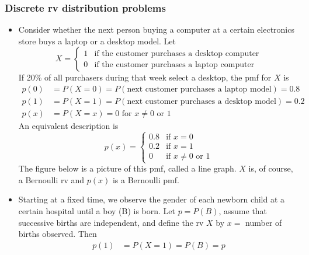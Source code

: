 \documentclass{report}
\begin{document}
    \pagebreak 
    \subsubsection{Discrete rv distribution problems}
    \begin{itemize}
        \item Consider whether the next person buying a computer at a certain electronics store buys a laptop or a desktop model. Let
            \[
                X = 
                \begin{cases} 
                    1 & \text{if the customer purchases a desktop computer} \\
                    0 & \text{if the customer purchases a laptop computer} 
                \end{cases}
            \]
            If 20\% of all purchasers during that week select a desktop, the pmf for \( X \) is
            \[
                \begin{aligned}
                    p(0) &= P(X = 0) = P(\text{next customer purchases a laptop model}) = 0.8 \\
                    p(1) &= P(X = 1) = P(\text{next customer purchases a desktop model}) = 0.2 \\
                    p(x) &= P(X = x) = 0 \text{ for } x \ne 0 \text{ or } 1
                \end{aligned}
            \]
            An equivalent description is
            \[
                p(x) = 
                \begin{cases}
                    0.8 & \text{if } x = 0 \\
                    0.2 & \text{if } x = 1 \\
                    0 & \text{if } x \ne 0 \text{ or } 1
                \end{cases}
            \]
            The figure below is a picture of this pmf, called a line graph. \( X \) is, of course, a Bernoulli rv and \( p(x) \) is a Bernoulli pmf.
            \bigbreak \noindent 
        \item Starting at a fixed time, we observe the gender of each newborn child at a certain hospital until a boy (B) is born. Let \( p = P(B) \), assume that successive births are independent, and define the rv \( X \) by \( x = \) number of births observed. Then
            \[
                \begin{aligned}
                    p(1) &= P(X = 1) = P(B) = p \\

\end{aligned}\]
\end{itemize}
\end{document}

